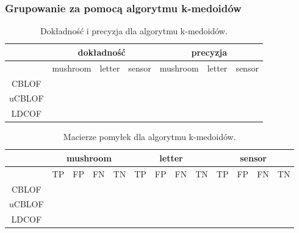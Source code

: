 \documentclass[11pt,a4paper,twoside]{article}
\begin{document}
\subsubsection{Grupowanie za pomocą algorytmu k-medoidów }


\begin{table}[ht]
\centering
\caption{Dokładność i precyzja dla algorytmu k-medoidów.}
\label{accPrec_v2}
\begin{tabular}{|*{7}{c|}}
\hline
 & \multicolumn{3}{c|}{dokładność} & \multicolumn{3}{c|}{precyzja} \\\hline
 & mushroom & letter & sensor & mushroom & letter & sensor \\\hline
 CBLOF &        &       &      &     &      &      \\\hline
 uCBLOF &    &          &      &     &     &      \\\hline
 LDCOF &        &         &       &     &    &      \\\hline
\end{tabular}
\end{table}



\begin{table}[ht]
\centering
\caption{Macierze pomyłek dla algorytmu k-medoidów.}
\label{confMatrix_v1}
\begin{tabular}{|*{13}{c|}}
\hline
 & \multicolumn{4}{c|}{mushroom} & \multicolumn{4}{c|}{letter} & \multicolumn{4}{c|}{sensor} \\\hline
 & TP & FP & FN & TN  & TP & FP & FN & TN  & TP & FP & FN & TN \\\hline
 CBLOF &       &          &       &       &     &    & & & & & &      \\\hline
 uCBLOF &      &      &        &       &     &  & & & & &   &    \\\hline
 LDCOF &         &       &         &             &     &    & & & & &  &  \\\hline
\end{tabular}
\end{table}


\end{document}
